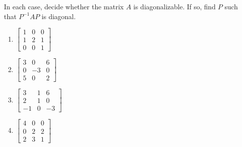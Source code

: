 \documentclass{ximera}
\author{Zack Reed}
\begin{document}
   
  \begin{problem}
  In each case, decide whether the matrix $A$ is diagonalizable. If so, find $P$ such that $P^{-1}AP$ is diagonal.
   
  \begin{problem}\label{prb:diagonalizable}
  \begin{enumerate}
   
  \item $\begin{bmatrix}
  1 & 0 & 0 \\
  1 & 2 & 1 \\
  0 & 0 & 1
  \end{bmatrix}$
  \item $\begin{bmatrix}
  3 &  0 & 6 \\
  0 & -3 & 0 \\
  5 &  0 & 2
  \end{bmatrix}$
  \item $\begin{bmatrix}
   3 &  1 &  6 \\
   2 &  1 &  0 \\
  -1 &  0 & -3
  \end{bmatrix}$
  \item $\begin{bmatrix}
  4 & 0 & 0 \\
  0 & 2 & 2 \\
  2 & 3 & 1
  \end{bmatrix}$
  \end{enumerate}
  \end{problem}
   
   
  \end{problem}
   
\end{document}
